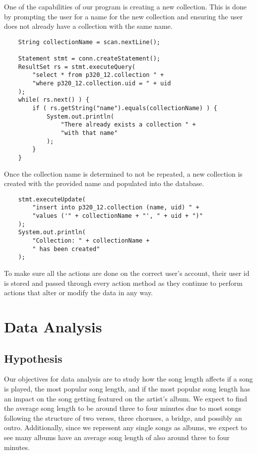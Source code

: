 \documentclass[12pt]{article}
\begin{document}
    One of the capabilities of our program is creating a new collection.
    This is done by prompting the user for a name for the new collection
    and ensuring the user does not already have a collection with the same
    name.
    \begin{lstlisting}
    String collectionName = scan.nextLine();

    Statement stmt = conn.createStatement();
    ResultSet rs = stmt.executeQuery(
        "select * from p320_12.collection " +
        "where p320_12.collection.uid = " + uid
    );
    while( rs.next() ) {
        if ( rs.getString("name").equals(collectionName) ) {
            System.out.println(
                "There already exists a collection " +
                "with that name"
            );
        }
    }
    \end{lstlisting}
    Once the collection name is determined to not be repeated, a new collection
    is created with the provided name and populated into the database.
    \begin{lstlisting}
    stmt.executeUpdate(
        "insert into p320_12.collection (name, uid) " +
        "values ('" + collectionName + "', " + uid + ")"
    );
    System.out.println(
        "Collection: " + collectionName +
        " has been created"
    );
    \end{lstlisting}
    To make sure all the actions are done on the correct user's account, their
    user id is stored and passed through every action method as they continue to perform
    actions that alter or modify the data in any way.



    \section{Data Analysis}
    
    
    \subsection{Hypothesis}

    Our objectives for data analysis are to study how the song length affects
    if a song is played, the most popular song length, and if the most popular
    song length has an impact on the song getting featured on the artist's album.
    We expect to find the average song length to be around three to four minutes
    due to most songs following the structure of two verses, three choruses,
    a bridge, and possibly an outro. Additionally, since we represent any single
    songs as albums, we expect to see many albums have an average song length of
    also around three to four minutes.
\end{document}
